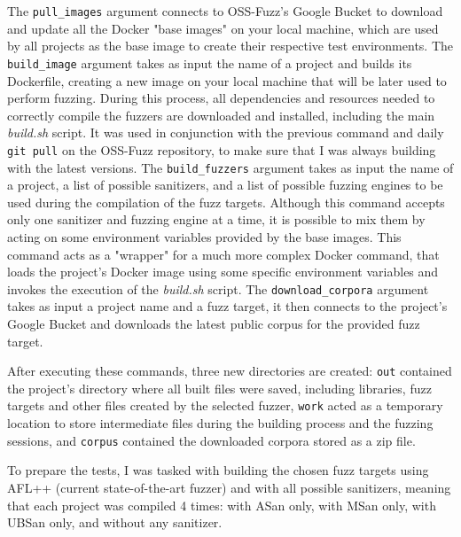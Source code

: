 The \verb|pull_images| argument connects to OSS-Fuzz's Google Bucket to download and update all the Docker "base images" on your local machine, which are used by all projects as the base image to create their respective test environments.
The \verb|build_image| argument takes as input the name of a project and builds its Dockerfile, creating a new image on your local machine that will be later used to perform fuzzing. During this process, all dependencies and resources needed to correctly compile the fuzzers are downloaded and installed, including the main \textit{build.sh} script. It was used in conjunction with the previous command and daily \verb|git pull| on the OSS-Fuzz repository, to make sure that I was always building with the latest versions. 
The \verb|build_fuzzers| argument takes as input the name of a project, a list of possible sanitizers, and a list of possible fuzzing engines to be used during the compilation of the fuzz targets. Although this command accepts only one sanitizer and fuzzing engine at a time, it is possible to mix them by acting on some environment variables provided by the base images. This command acts as a "wrapper" for a much more complex Docker command, that loads the project's Docker image using some specific environment variables and invokes the execution of the \textit{build.sh} script.
The \verb|download_corpora| argument takes as input a project name and a fuzz target, it then connects to the project's Google Bucket and downloads the latest public corpus for the provided fuzz target.

After executing these commands, three new directories are created: \verb|out| contained the project's directory where all built files were saved, including libraries, fuzz targets and other files created by the selected fuzzer, \verb|work| acted as a temporary location to store intermediate files during the building process and the fuzzing sessions, and \verb|corpus| contained the downloaded corpora stored as a zip file.

To prepare the tests, I was tasked with building the chosen fuzz targets using AFL++ (current state-of-the-art fuzzer) and with all possible sanitizers, meaning that each project was compiled 4 times: with ASan only, with MSan only, with UBSan only, and without any sanitizer.

